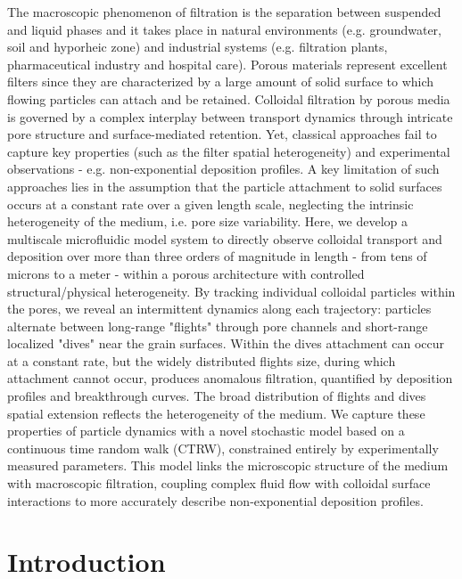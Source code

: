 \documentclass[singlecolumn,pre,notitlepage,preprintnumbers,floatfix,superscriptaddress]{revtex4-1}
\begin{document}
\noindent
The macroscopic phenomenon of filtration is the separation between suspended and liquid phases and it takes place in natural environments (e.g. groundwater, soil and hyporheic zone) and industrial systems (e.g. filtration plants, pharmaceutical industry and hospital care). Porous materials represent excellent filters since they are characterized by a large amount of solid surface to which flowing particles can attach and be retained. Colloidal filtration by porous media is governed by a complex interplay between transport dynamics through intricate pore structure and surface-mediated retention. Yet, classical approaches fail to capture key properties (such as the filter spatial heterogeneity) and experimental observations - e.g. non-exponential deposition profiles. A key limitation of such approaches lies in the assumption that the particle attachment to solid surfaces occurs at a constant rate over a given length scale, neglecting the intrinsic heterogeneity of the medium, i.e. pore size variability. Here, we develop a multiscale microfluidic model system to directly observe colloidal transport and deposition over more than three orders of magnitude in length - from tens of microns to a meter - within a porous architecture with controlled structural/physical heterogeneity. By tracking individual colloidal particles within the pores, we reveal an intermittent dynamics along each trajectory: particles alternate between long-range "flights" through pore channels and short-range localized "dives" near the grain surfaces. Within the dives attachment can occur at a constant rate, but the widely distributed flights size, during which attachment cannot occur, produces anomalous filtration, quantified by deposition profiles and breakthrough curves. The broad distribution of flights and dives spatial extension reflects the heterogeneity of the medium. We capture these properties of particle dynamics with a novel stochastic model based on a continuous time random walk (CTRW), constrained entirely by experimentally measured parameters. This model links the microscopic structure of the medium with macroscopic filtration, coupling complex fluid flow with colloidal surface interactions to more accurately describe non-exponential deposition profiles.

\section{Introduction}
\end{document}
